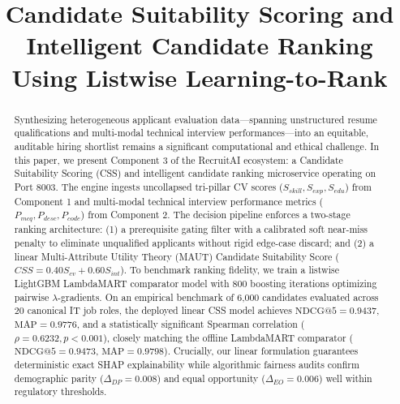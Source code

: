 \documentclass[conference]{IEEEtran}
\begin{document}
\title{Candidate Suitability Scoring and Intelligent Candidate Ranking Using Listwise Learning-to-Rank}

\author{
}

\maketitle

\begin{abstract}
Synthesizing heterogeneous applicant evaluation data—spanning unstructured resume qualifications and multi-modal technical interview performances—into an equitable, auditable hiring shortlist remains a significant computational and ethical challenge. In this paper, we present Component 3 of the RecruitAI ecosystem: a Candidate Suitability Scoring (CSS) and intelligent candidate ranking microservice operating on Port 8003. The engine ingests uncollapsed tri-pillar CV scores ($S_{skill}, S_{exp}, S_{edu}$) from Component 1 and multi-modal technical interview performance metrics ($P_{mcq}, P_{desc}, P_{code}$) from Component 2. The decision pipeline enforces a two-stage ranking architecture: (1) a prerequisite gating filter with a calibrated soft near-miss penalty to eliminate unqualified applicants without rigid edge-case discard; and (2) a linear Multi-Attribute Utility Theory (MAUT) Candidate Suitability Score ($CSS = 0.40 S_{cv} + 0.60 S_{int}$). To benchmark ranking fidelity, we train a listwise LightGBM LambdaMART comparator model with 800 boosting iterations optimizing pairwise $\lambda$-gradients. On an empirical benchmark of 6,000 candidates evaluated across 20 canonical IT job roles, the deployed linear CSS model achieves $\text{NDCG@5} = 0.9437$, $\text{MAP} = 0.9776$, and a statistically significant Spearman correlation ($\rho = 0.6232, p < 0.001$), closely matching the offline LambdaMART comparator ($\text{NDCG@5} = 0.9473$, $\text{MAP} = 0.9798$). Crucially, our linear formulation guarantees deterministic exact SHAP explainability while algorithmic fairness audits confirm demographic parity ($\Delta_{DP} = 0.008$) and equal opportunity ($\Delta_{EO} = 0.006$) well within regulatory thresholds.
\end{abstract}
\end{document}
